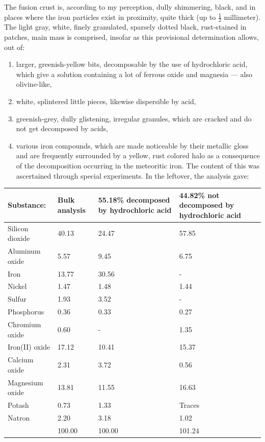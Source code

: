 \documentclass[a4paper, 12pt, oneside]{article}
\begin{document}
The fusion crust is, according to my perception, dully shimmering, black, and in places where the iron particles exist in proximity, quite thick (up to $\mathsf{\frac{1}{2}}$ millimeter). The light gray, white, finely granulated, sparsely dotted black, rust-stained in patches, main mass is comprised, insofar as this provisional determination allows, out of:
\begin{enumerate}
    \item larger, greenish-yellow bits, decomposable by the use of hydrochloric acid, which give a solution containing a lot of ferrous oxide and magnesia --- also olivine-like,
    \item white, splintered little pieces, likewise dispersible by acid,
    \item greenish-grey, dully glistening, irregular granules, which are cracked and do not get decomposed by acids,
    \item various iron compounds, which are made noticeable by their metallic gloss and are frequently surrounded by a yellow, rust colored halo as a consequence of the decomposition occurring in the meteoritic iron. The content of this was ascertained through special experiments. In the leftover, the analysis gave:
\end{enumerate}
\begin{center}
    \begin{tabular}{ |l|p{1.5cm}|p{3.2cm}|p{2.9cm}| }
        \hline
        Substance: & Bulk analysis & 55.18\% decomposed by hydrochloric acid & 44.82\% not decomposed by hydrochloric acid\\\hline
        Silicon dioxide & 40.13 & 24.47 & 57.85\\\hline
        Aluminum oxide & 5.57 & 9.45 & 6.75\\\hline
        Iron & 13.77 & 30.56 & -\\\hline
        Nickel & 1.47 & 1.48 & 1.44\\\hline
        Sulfur & 1.93 & 3.52 & -\\\hline
        Phosphorus & 0.36 & 0.33 & 0.27\\\hline
        Chromium oxide & 0.60 & - & 1.35\\\hline
        Iron(II) oxide & 17.12 & 10.41 & 15.37\\\hline
        Calcium oxide & 2.31 & 3.72 & 0.56\\\hline
        Magnesium oxide & 13.81 & 11.55 & 16.63\\\hline
        Potash & 0.73 & 1.33 & Traces\\\hline
        Natron & 2.20 & 3.18 & 1.02\\\hline
        & 100.00 & 100.00 & 101.24\\
        \hline
    \end{tabular}
\end{center}
\end{document}
